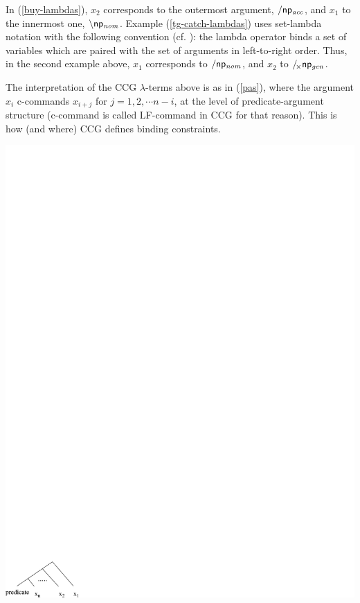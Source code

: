 \documentclass[11pt]{article}
\begin{document}
\noindent In (\ref{buy-lambdas}), $x_2$ corresponds to the outermost
argument, $/ \mathsf{np_{\mathit{acc}}}$, and $x_1$ to the innermost one, $\backslash
\mathsf{np_{\mathit{nom}}}$. Example (\ref{tg-catch-lambdas}) uses set-lambda
notation with the following convention (cf. \cite{bozsahinsteedman03}):
the lambda operator binds a set of variables which are paired with the
set of arguments in left-to-right order. Thus, in the second example
above, $x_1$ corresponds to $/ \mathsf{np_{\mathit{nom}}}$, and $x_2$ to
$/\!_{\times} \mathsf{np_{\mathit{gen}}}$.

The interpretation of the CCG $\lambda$-terms above is as in
(\ref{pas}), where the argument $x_i$ c-commands $x_{i+j}$ for
$j=1,2,\cdots n-i$, at the level of predicate-argument structure
(c-command is called LF-command in CCG for that reason). This is how
(and where) CCG defines binding constraints.

\begin{exe}
\ex \label{pas}
\begin{minipage}{0.7\textwidth}
\includegraphics{pas.pdf}
\end{minipage}
\end{exe}
\end{document}
